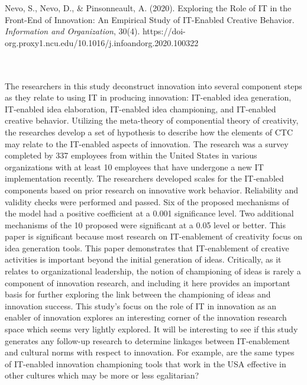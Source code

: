 \documentclass{apa7}
\begin{document}
\hfill\begin{minipage}{\dimexpr\textwidth-1in}
\begin{hangparas}{.25in}{1}
Nevo, S., Nevo, D., \& Pinsonneault, A. (2020). Exploring the Role of IT in the Front-End of Innovation: An Empirical Study of IT-Enabled Creative Behavior. \textit{Information and Organization}, 30(4). https://doi-org.proxy1.ncu.edu/10.1016/j.infoandorg.2020.100322
\end{hangparas}
\xdef\tpd{\the\prevdepth}
\end{minipage}
\\
\\
The researchers in this study deconstruct innovation into several component steps as they relate to using IT in producing innovation: IT-enabled idea generation, IT-enabled idea elaboration, IT-enabled idea championing, and IT-enabled creative behavior. Utilizing the meta-theory of componential theory of creativity, the researches develop a set of hypothesis to describe how the elements of CTC may relate to the IT-enabled aspects of innovation. The research was a survey completed by 337 employees from within the United States in various organizations with at least 10 employees that have undergone a new IT implementation recently. The researchers developed scales for the IT-enabled components based on prior research on innovative work behavior. Reliability and validity checks were performed and passed. Six of the proposed mechanisms of the model had a positive coefficient at a 0.001 significance level. Two additional mechanisms of the 10 proposed were significant at a 0.05 level or better. This paper is significant because most research on IT-enablement of creativity focus on idea generation tools. This paper demonstrates that IT-enablement of creative activities is important beyond the initial generation of ideas. Critically, as it relates to organizational leadership, the notion of championing of ideas is rarely a component of innovation research, and including it here provides an important basis for further exploring the link between the championing of ideas and innovation success. This study's focus on the role of IT in innovation as an enabler of innovation explores an interesting corner of the innovation research space which seems very lightly explored. It will be interesting to see if this study generates any follow-up research to determine linkages between IT-enablement and cultural norms with respect to innovation. For example, are the same types of IT-enabled innovation championing tools that work in the USA effective in other cultures which may be more or less egalitarian?
\end{document}
